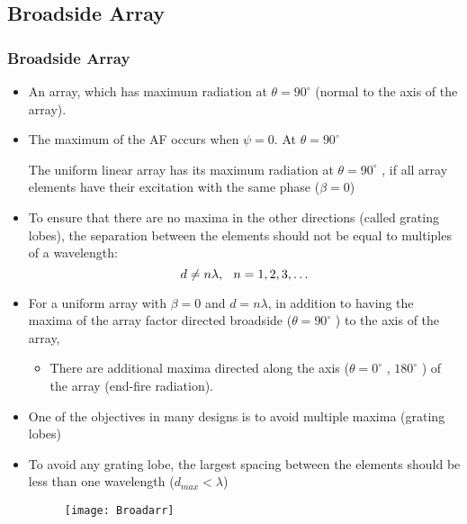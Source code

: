 \documentclass{beamer}
\begin{document}
	\begin{frame}
		\subsection{Broadside Array}
		\frametitle{Broadside Array}
		\begin{itemize}
			\item An array, which has maximum radiation at $\theta = 90^\circ $ (normal to the axis of the array).
			\item The maximum of the AF occurs when $\psi = 0$. At $\theta = 90^\circ$
			\begin{block}{}
				The uniform linear array has its maximum radiation at $ \theta = 90^\circ $ , if all array
				elements have their excitation with the same phase ($ \beta = 0 $)
			\end{block}
			\item To ensure that there are no maxima in the other directions (called grating
			lobes), the separation between the elements should not be equal to multiples
			of a wavelength:
			\begin{equation}
			d \neq n\lambda,\hskip0.1in n = 1, 2, 3, \ldots
			\end{equation}
		\end{itemize}
	\end{frame}
	\begin{frame}
		\begin{itemize}
			\item For a uniform array with $ \beta = 0 $ and $ d = n\lambda $, in addition to having the maxima of the array factor directed broadside ($ \theta = 90^\circ $ )
			to the axis of the array, 
			\begin{itemize}
				\item There are additional maxima directed along the axis ($\theta = 0^\circ$ , $180^\circ$ ) of the array (end-fire radiation).
			\end{itemize}
			\item One of the objectives in many designs is to avoid multiple maxima (grating
			lobes)
			\item To avoid any grating lobe, the largest
			spacing between the elements should be less than one wavelength ($ d_{max} < \lambda $)
			\begin{figure}
				\centering
				\texttt{[image: Broadarr]}
				\caption{}
				\label{fig:broadarr}
			\end{figure}
			
		\end{itemize}
	\end{frame}
\end{document}
